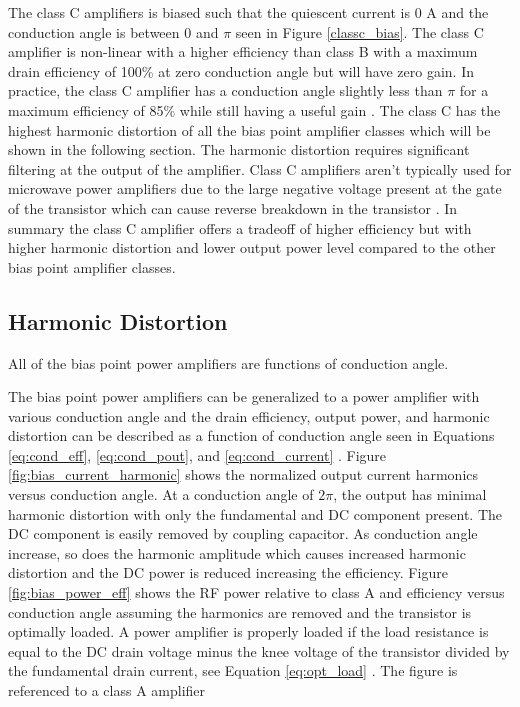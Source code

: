 The class C amplifiers is biased such that the quiescent current is 0 A and the conduction angle is between $0$ and $\pi$ seen in Figure \ref{classc_bias}. The class C amplifier is non-linear with a higher efficiency than class B with a maximum drain efficiency of 100\% at zero conduction angle but will have zero gain. In practice, the class C amplifier has a conduction angle slightly less than $\pi$ for a maximum efficiency of 85\% while still having a useful gain \cite{Raab2003}. The class C has the highest harmonic distortion of all the bias point amplifier classes which will be shown in the following section. The harmonic distortion requires significant filtering at the output of the amplifier. Class C amplifiers aren't typically used for microwave power amplifiers due to the large negative voltage present at the gate of the transistor which can cause reverse breakdown in the transistor \cite{C.Cripps2006}. In summary the class C amplifier offers a tradeoff of higher efficiency but with higher harmonic distortion and lower output power level compared to the other bias point amplifier classes.

\subsection{Harmonic Distortion}

All of the bias point power amplifiers are functions of conduction angle.

The bias point power amplifiers can be generalized to a power amplifier with various conduction angle and the drain efficiency, output power, and harmonic distortion can be described as a function of conduction angle seen in Equations \ref{eq:cond_eff}, \ref{eq:cond_pout}, and \ref{eq:cond_current} \cite{Hella}. Figure \ref{fig:bias_current_harmonic} shows the normalized output current harmonics versus conduction angle. At a conduction angle of $2\pi$, the output has minimal harmonic distortion with only the fundamental and DC component  present. The DC component is easily removed by coupling capacitor. As conduction angle increase, so does the harmonic amplitude which causes increased harmonic distortion and the DC power is reduced increasing the efficiency. Figure \ref{fig:bias_power_eff} shows the RF power relative to class A and efficiency versus conduction angle assuming the harmonics are removed and the transistor is optimally loaded. A power amplifier is properly loaded if the load resistance is equal to the DC drain voltage minus the knee voltage of the transistor divided by the fundamental drain current, see Equation \ref{eq:opt_load} \cite{Hella}. The figure is referenced to a class A amplifier


